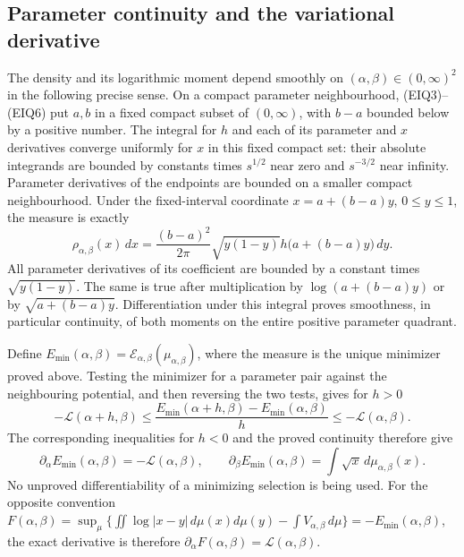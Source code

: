 \subsection{Parameter continuity and the variational derivative}
The density and its logarithmic moment depend smoothly on
$(\alpha,\beta)\in(0,\infty)^2$ in the following precise sense.
On a compact parameter neighbourhood, (EIQ3)--(EIQ6) put $a,b$ in a
fixed compact subset of $(0,\infty)$, with $b-a$ bounded below by a
positive number.  The integral for $h$ and each of its parameter and
$x$ derivatives converge uniformly for $x$ in this fixed compact set:
their absolute integrands are bounded by constants times $s^{1/2}$
near zero and $s^{-3/2}$ near infinity. Parameter derivatives of the
endpoints are bounded on a smaller compact neighbourhood.
Under the fixed-interval coordinate
$x=a+(b-a)y$, $0\leq y\leq1$, the measure is exactly
\begin{equation}\tag{EIQ29}
 \rho_{\alpha,\beta}(x)\,dx
 =\frac{(b-a)^2}{2\pi}\sqrt{y(1-y)}
                  h\bigl(a+(b-a)y\bigr)\,dy.
\end{equation}
All parameter derivatives of its coefficient are bounded by a constant
times $\sqrt{y(1-y)}$. The same is true after multiplication by
$\log(a+(b-a)y)$ or by $\sqrt{a+(b-a)y}$.
Differentiation under this integral proves smoothness, in particular
continuity, of both moments on the entire positive parameter quadrant.

Define $E_{\min}(\alpha,\beta)=\mathcal E_{\alpha,\beta}(\mu_{\alpha,\beta})$,
where the measure is the unique minimizer proved above.
Testing the minimizer for a parameter pair against the neighbouring
potential, and then reversing the two tests, gives for $h>0$
\[
 -\mathcal L(\alpha+h,\beta)
 \leq\frac{E_{\min}(\alpha+h,\beta)-E_{\min}(\alpha,\beta)}h
 \leq-\mathcal L(\alpha,\beta).
\]
The corresponding inequalities for $h<0$ and the proved continuity
therefore give
\begin{equation}\tag{EIQ30}
 \partial_\alpha E_{\min}(\alpha,\beta)=-\mathcal L(\alpha,\beta),\qquad
 \partial_\beta E_{\min}(\alpha,\beta)
        =\int\sqrt{x}\,d\mu_{\alpha,\beta}(x).
\end{equation}
No unproved differentiability of a minimizing selection is being used.
For the opposite convention
$F(\alpha,\beta)=\sup_\mu\{\iint\log|x-y|\,d\mu(x)d\mu(y)
-\int V_{\alpha,\beta}\,d\mu\}=-E_{\min}(\alpha,\beta)$,
the exact derivative is therefore
$\partial_\alpha F(\alpha,\beta)=\mathcal L(\alpha,\beta)$.

